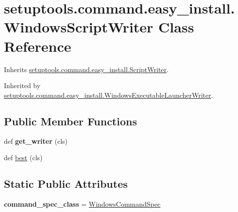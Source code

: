 \hypertarget{classsetuptools_1_1command_1_1easy__install_1_1_windows_script_writer}{}\section{setuptools.\+command.\+easy\+\_\+install.\+Windows\+Script\+Writer Class Reference}
\label{classsetuptools_1_1command_1_1easy__install_1_1_windows_script_writer}


Inherits \hyperlink{classsetuptools_1_1command_1_1easy__install_1_1_script_writer}{setuptools.\+command.\+easy\+\_\+install.\+Script\+Writer}.



Inherited by \hyperlink{classsetuptools_1_1command_1_1easy__install_1_1_windows_executable_launcher_writer}{setuptools.\+command.\+easy\+\_\+install.\+Windows\+Executable\+Launcher\+Writer}.

\subsection*{Public Member Functions}
\begin{DoxyCompactItemize}
\item 
\mbox{\label{classsetuptools_1_1command_1_1easy__install_1_1_windows_script_writer_aad977a36fa4162079833bcfd73384f99}} 
def {\bfseries get\+\_\+writer} (cls)
\item 
def \hyperlink{classsetuptools_1_1command_1_1easy__install_1_1_windows_script_writer_a0e902494038a088017e95fdfe07b76f1}{best} (cls)
\end{DoxyCompactItemize}
\subsection*{Static Public Attributes}
\begin{DoxyCompactItemize}
\item 
\mbox{\label{classsetuptools_1_1command_1_1easy__install_1_1_windows_script_writer_ab6b5a19df08d762e4fa963fc6c75e4c8}} 
{\bfseries command\+\_\+spec\+\_\+class} = \hyperlink{classsetuptools_1_1command_1_1easy__install_1_1_windows_command_spec}{Windows\+Command\+Spec}
\end{DoxyCompactItemize}


